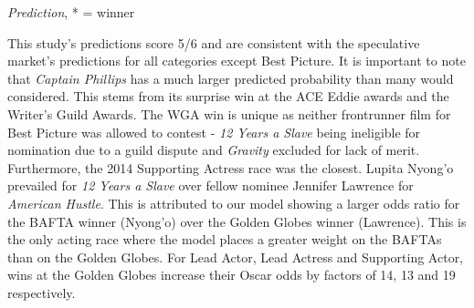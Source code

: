 \documentclass[jou,apacite]{apa6}
\begin{document}
\begin{table}[b]
\caption{2014 Oscars: Predictions (Winner and Runner-up)}\label{tab4}
\begin{center}
\end{center}
\begin{tablenotes}{\footnotesize
\emph{Prediction}, * = winner}\end{tablenotes}
\end{table}

This study's predictions score 5/6 and are consistent with the speculative market's predictions for all categories except Best Picture. It is important to note that \emph{Captain Phillips} has a much larger predicted probability than many would considered. This stems from its surprise win at the ACE Eddie awards and the Writer's Guild Awards. The WGA win is unique as neither frontrunner film for Best Picture was allowed to contest - \emph{12 Years a Slave} being ineligible for nomination due to a guild dispute and \emph{Gravity} excluded for lack of merit. Furthermore, the 2014 Supporting Actress race was the closest. Lupita Nyong'o prevailed for \emph{12 Years a Slave} over fellow nominee Jennifer Lawrence for \emph{American Hustle}. This is attributed to our model showing a larger odds ratio for the BAFTA winner (Nyong'o) over the Golden Globes winner (Lawrence). This is the only acting race where the model places a greater weight on the BAFTAs than on the Golden Globes. For Lead Actor, Lead Actress and Supporting Actor, wins at the Golden Globes increase their Oscar odds by factors of 14, 13 and 19 respectively.
\end{document}
